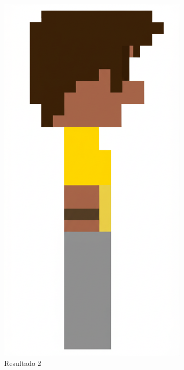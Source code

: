 \begin{figure}[htbp]
\begin{subfigure}{0.22\linewidth}
        \includegraphics[width=1\linewidth]{figs/geminiPro/chat1/res2_tela1.png}
        \caption{\small Resultado 2}
        \label{fig:geminiPro1b}
    \end{subfigure}
    \begin{subfigure}{0.22\linewidth}

\end{subfigure}
\end{figure}
